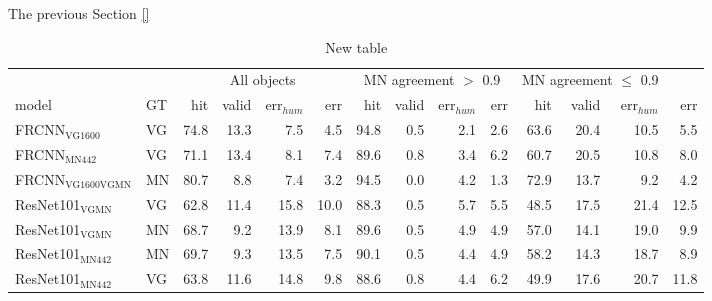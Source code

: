 The previous Section \ref{}

\begin{table}[t]
\centering
	\small
\begin{tabular}{ll|rrrr|rrrr|rrrr}
\toprule
&  & \multicolumn{4}{c||}{All objects} & \multicolumn{4}{c||}{MN agreement $>$ 0.9} & \multicolumn{3}{c}{MN agreement $\leq$ 0.9}\\
               model &  GT &  hit &  valid &  err$_{hum}$ &  err &  hit &  valid &   err$_{hum}$ &   err &  hit &  valid &  err$_{hum}$ &  err \\
\midrule
       FRCNN$_{\text{VG1600}}$ &  VG & 74.8 &     13.3 &         7.5 &    4.5 &      94.8 &           0.5 &              2.1 &             2.6 &     63.6 &         20.4 &            10.5 &            5.5 \\
        FRCNN$_{\text{MN442}}$ &  VG & 71.1 &     13.4 &         8.1 &    7.4 &      89.6 &           0.8 &              3.4 &             6.2 &     60.7 &         20.5 &            10.8 &            8.0 \\
 FRCNN$_{\text{VG1600VGMN}}$ &  MN & 80.7 &      8.8 &         7.4 &    3.2 &      94.5 &           0.0 &              4.2 &             1.3 &     72.9 &         13.7 &             9.2 &            4.2 \\
     ResNet101$_{\text{VGMN}}$ &  VG & 62.8 &     11.4 &        15.8 &   10.0 &      88.3 &           0.5 &              5.7 &             5.5 &     48.5 &         17.5 &            21.4 &           12.5 \\
     ResNet101$_{\text{VGMN}}$ &  MN & 68.7 &      9.2 &        13.9 &    8.1 &      89.6 &           0.5 &              4.9 &             4.9 &     57.0 &         14.1 &            19.0 &            9.9 \\
    ResNet101$_{\text{MN442}}$ &  MN & 69.7 &      9.3 &        13.5 &    7.5 &      90.1 &           0.5 &              4.4 &             4.9 &     58.2 &         14.3 &            18.7 &            8.9 \\
    ResNet101$_{\text{MN442}}$ &  VG & 63.8 &     11.6 &        14.8 &    9.8 &      88.6 &           0.8 &              4.4 &             6.2 &     49.9 &         17.6 &            20.7 &           11.8 \\
\bottomrule
\end{tabular}


\caption{New table} \label{tab:humanlike}
\end{table}


